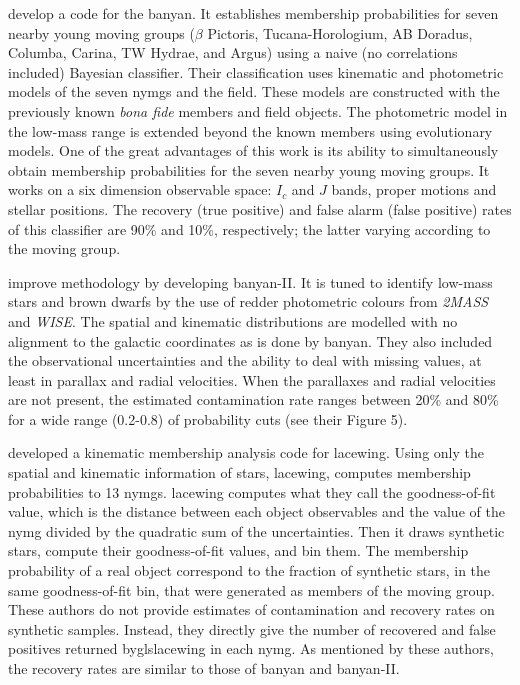 \citet{Malo2013} develop a code for the \gls{banyan}. It establishes membership probabilities for seven nearby young moving groups ($\beta$ Pictoris, Tucana-Horologium, AB Doradus, Columba, Carina, TW Hydrae, and Argus) using a naive (no correlations included) Bayesian classifier. Their classification uses kinematic and photometric models of the seven \glspl{nymg} and the field. These models are constructed with the previously known \emph{bona fide} members and field objects. The photometric model in the low-mass range is extended beyond the known members using evolutionary models. One of the great advantages of this work is its ability to simultaneously obtain membership probabilities for the seven nearby young moving groups. It works on a six dimension observable space: $I_c$ and $J$ bands, proper motions and stellar positions. The recovery (true positive) and false alarm (false positive) rates of this classifier are 90\% and 10\%, respectively; the latter varying according to the moving group.

\citet{Gagne2014} improve \citet{Malo2013} methodology by developing \gls{banyan}-II. It is tuned to  identify low-mass stars and brown dwarfs by the use of redder photometric colours from \emph{2MASS} and \emph{WISE}. The spatial and kinematic distributions are modelled with no alignment to the galactic coordinates as is done by \gls{banyan}. They also included the observational uncertainties and the ability to deal with missing values, at least in parallax and radial velocities. When the parallaxes and radial velocities are not present, the estimated contamination rate ranges between 20\% and 80\% for a wide range (0.2-0.8) of probability cuts (see their Figure 5).

\citet{Riedel2017} developed a kinematic membership analysis code for \gls{lacewing}. Using only the spatial and kinematic information of stars, \gls{lacewing}, computes membership probabilities to 13 \glspl{nymg}. \gls{lacewing} computes what they call the goodness-of-fit value, which is the distance between each object observables and the value of the \gls{nymg} divided by the quadratic sum of the uncertainties. Then it draws synthetic stars, compute their goodness-of-fit values, and bin them. The membership probability of a real object correspond to the fraction of synthetic stars, in the same goodness-of-fit bin, that were generated as members of the moving group. These authors do not provide estimates of contamination and recovery rates on synthetic samples. Instead, they directly give the number of recovered and false positives returned bygls{lacewing} in each \gls{nymg}. As mentioned by these authors, the recovery rates are similar to those of \gls{banyan} and \gls{banyan}-II. 


